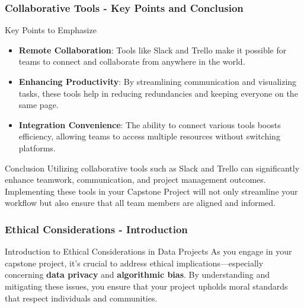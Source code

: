 \documentclass[aspectratio=169]{beamer}
\begin{document}
\begin{frame}[fragile]
    \frametitle{Collaborative Tools - Key Points and Conclusion}
    \begin{block}{Key Points to Emphasize}
        \begin{itemize}
            \item \textbf{Remote Collaboration}: Tools like Slack and Trello make it possible for teams to connect and collaborate from anywhere in the world.
            \item \textbf{Enhancing Productivity}: By streamlining communication and visualizing tasks, these tools help in reducing redundancies and keeping everyone on the same page.
            \item \textbf{Integration Convenience}: The ability to connect various tools boosts efficiency, allowing teams to access multiple resources without switching platforms.
        \end{itemize}
    \end{block}

    \begin{block}{Conclusion}
        Utilizing collaborative tools such as Slack and Trello can significantly enhance teamwork, communication, and project management outcomes. Implementing these tools in your Capstone Project will not only streamline your workflow but also ensure that all team members are aligned and informed.
    \end{block}
\end{frame}

\begin{frame}[fragile]
    \frametitle{Ethical Considerations - Introduction}
    \begin{block}{Introduction to Ethical Considerations in Data Projects}
        As you engage in your capstone project, it's crucial to address ethical implications—especially concerning \textbf{data privacy} and \textbf{algorithmic bias}. 
        By understanding and mitigating these issues, you ensure that your project upholds moral standards that respect individuals and communities.
    \end{block}
\end{frame}
\end{document}
